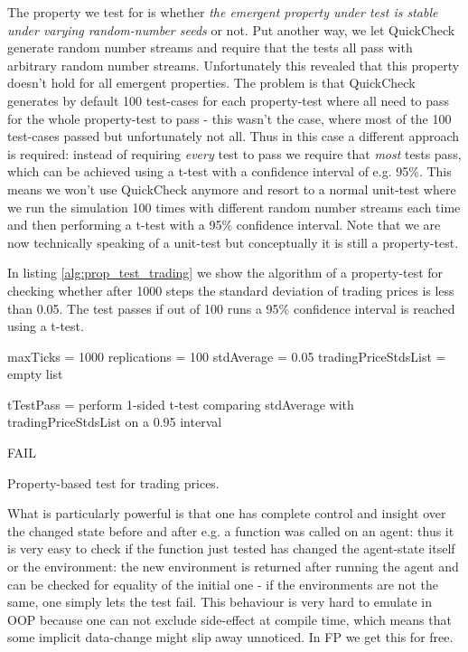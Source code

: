 The property we test for is whether \textit{the emergent property under test is stable under varying random-number seeds} or not. Put another way, we let QuickCheck generate random number streams and require that the tests all pass with arbitrary random number streams. Unfortunately this revealed that this property doesn't hold for all emergent properties. The problem is that QuickCheck generates by default 100 test-cases for each property-test where all need to pass for the whole property-test to pass - this wasn't the case, where most of the 100 test-cases passed but unfortunately not all. Thus in this case a different approach is required: instead of requiring \textit{every} test to pass we require that \textit{most} tests pass, which can be achieved using a t-test with a confidence interval of e.g. 95\%. This means we won't use QuickCheck anymore and resort to a normal unit-test where we run the simulation 100 times with different random number streams each time and then performing a t-test with a 95\% confidence interval. Note that we are now technically speaking of a unit-test but conceptually it is still a property-test.

In listing \ref{alg:prop_test_trading} we show the algorithm of a property-test for checking whether after 1000 steps the standard deviation of trading prices is less than 0.05. The test passes if out of 100 runs a 95\% confidence interval is reached using a t-test.

\begin{algorithm}
maxTicks = 1000\;
replications = 100\;
stdAverage = 0.05\;
tradingPriceStdsList = empty list\;


tTestPass = perform 1-sided t-test comparing stdAverage with tradingPriceStdsList on a 0.95 interval\;

 {
  FAIL\;
}
\caption{Property-based test for trading prices.}
\end{algorithm}
\label{alg:prop_test_trading}

What is particularly powerful is that one has complete control and insight over the changed state before and after e.g. a function was called on an agent: thus it is very easy to check if the function just tested has changed the agent-state itself or the environment: the new environment is returned after running the agent and can be checked for equality of the initial one - if the environments are not the same, one simply lets the test fail. This behaviour is very hard to emulate in OOP because one can not exclude side-effect at compile time, which means that some implicit data-change might slip away unnoticed. In FP we get this for free.
